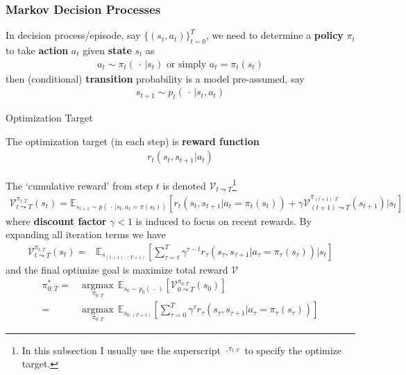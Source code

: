 \subsubsection{Markov Decision Processes}
In decision process/episode, say $ \{(s_t,a_t)\}_{t=0}^T $, we need to determine a \textbf{policy} $ \pi_t $ to take \textbf{action}  $ a_t $ given \textbf{state}  $ s_t $ as
\begin{align}
    a_t\sim \pi_t(\, \cdot \,| s_t) \text{ or simply }a_t=\pi_t(s_t)
\end{align}
then (conditional) \textbf{transition}  probability is a model pre-assumed, say
\begin{align}
    s_{t+1}\sim p_t\left(\, \cdot \, |s_t,a_t\right) 
\end{align}


\begin{point}
    Optimization Target
\end{point}

The optimization target (in each step) is \textbf{reward function} 
\begin{align}
    r_t(s_t,s_{t+1}|a_t)
\end{align}

The `cumulative reward' from step $ t $ is denoted $ \mathcal{V}_{t\leadsto T} $\footnote{In this subsection I usually use the superscript $ \cdot ^{\pi_{t:T}} $ to specify the optimize target.} 
\begin{align}\label{EqaVLearningIteration}
    \mathcal{V}_{t\leadsto T}^{\pi_{t:T}}(s_t)=\mathbb{E}_{s_{t+1}\sim p\left(\, \cdot \, |s_t,a_t=\pi(s_t)\right)}\left[ r_t\left(s_t,s_{t+1}|a_t=\pi_t(s_t)\right)+\gamma \mathcal{V}_{(t+1)\leadsto T}^{\pi_{(t+1):T}} (s_{t+1})\big|s_t\right]
\end{align}
where \textbf{discount factor} $ \gamma<1  $ is induced to focus on recent rewards. By expanding all iteration terms we have
\begin{align}
    \mathcal{V}_{t\leadsto T}^{\pi_{t:T}}(s_t)=&\mathbb{E}_{s_{(t+1):(T+1)}}\left[ \sum_{\tau = t}^T\gamma ^{\tau-t}r_\tau\left(s_\tau,s_{\tau+1}|a_\tau=\pi_\tau(s_\tau)\right)\big|s_t \right]
\end{align}
and the final optimize goal is maximize total reward $ \mathcal{V} $
\begin{align}\label{EqaVLearningTarget}
    \pi_{0:T}^*=&\mathop{\arg\max}\limits_{\pi_{0:T}}\,\mathbb{E}_{s_0\sim p_0(\, \cdot \, )}\left[ \mathcal{V}_{0\leadsto T}^{\pi_{0:T}}(s_0) \right]  \\
    =&\mathop{\arg\max}\limits_{\pi_{0:T}}\,\mathbb{E}_{s_{0:(T+1)}}\left[ \sum_{\tau = 0}^T\gamma ^{\tau}r_\tau\left(s_\tau,s_{\tau+1}|a_\tau=\pi_\tau(s_\tau)\right) \right]
\end{align}




